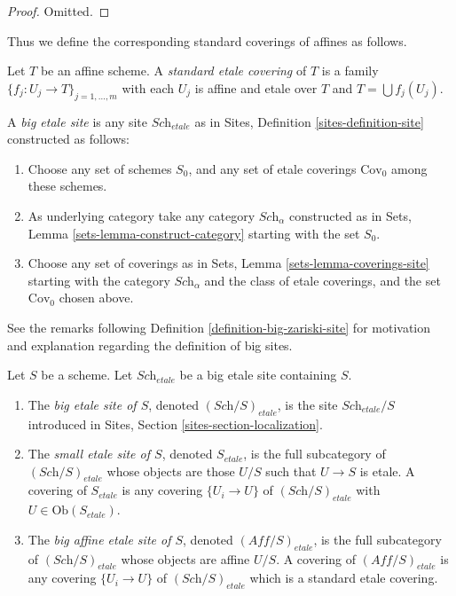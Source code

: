 \begin{proof}
Omitted.
\end{proof}

\noindent
Thus we define the corresponding standard coverings of affines as follows.

\begin{definition}
\label{definition-standard-etale}
Let $T$ be an affine scheme. A {\it standard etale covering}
of $T$ is a family $\{f_j : U_j \to T\}_{j = 1, \ldots, m}$
with each $U_j$ is affine and etale over $T$ and
$T = \bigcup f_j(U_j)$.
\end{definition}

\begin{definition}
\label{definition-big-etale-site}
A {\it big etale site} is any site $\textit{Sch}_{etale}$ as in
Sites, Definition \ref{sites-definition-site} constructed as follows:
\begin{enumerate}
\item Choose any set of schemes $S_0$, and any set of etale coverings
$\text{Cov}_0$ among these schemes.
\item As underlying category take any category $\textit{Sch}_\alpha$
constructed as in Sets, Lemma \ref{sets-lemma-construct-category}
starting with the set $S_0$.
\item Choose any set of coverings as in
Sets, Lemma \ref{sets-lemma-coverings-site} starting with the
category $\textit{Sch}_\alpha$ and the class of etale coverings,
and the set $\text{Cov}_0$ chosen above.
\end{enumerate}
\end{definition}

\noindent
See the remarks following Definition \ref{definition-big-zariski-site}
for motivation and explanation regarding the definition of big sites.

\begin{definition}
\label{definition-big-small-etale}
Let $S$ be a scheme. Let $\textit{Sch}_{etale}$ be a big etale
site containing $S$.
\begin{enumerate}
\item The {\it big etale site of $S$}, denoted
$(\textit{Sch}/S)_{etale}$, is the site $\textit{Sch}_{etale}/S$
introduced in Sites, Section \ref{sites-section-localization}.
\item The {\it small etale site of $S$}, denoted
$S_{etale}$, is the full subcategory of $(\textit{Sch}/S)_{etale}$
whose objects are those $U/S$ such that $U \to S$ is etale.
A covering of $S_{etale}$ is any covering $\{U_i \to U\}$ of
$(\textit{Sch}/S)_{etale}$ with $U \in \text{Ob}(S_{etale})$.
\item The {\it big affine etale site of $S$}, denoted
$(\textit{Aff}/S)_{etale}$, is the full subcategory of
$(\textit{Sch}/S)_{etale}$ whose objects are affine $U/S$.
A covering of $(\textit{Aff}/S)_{etale}$ is any covering
$\{U_i \to U\}$ of $(\textit{Sch}/S)_{etale}$ which is a
standard etale covering.
\end{enumerate}
\end{definition}

